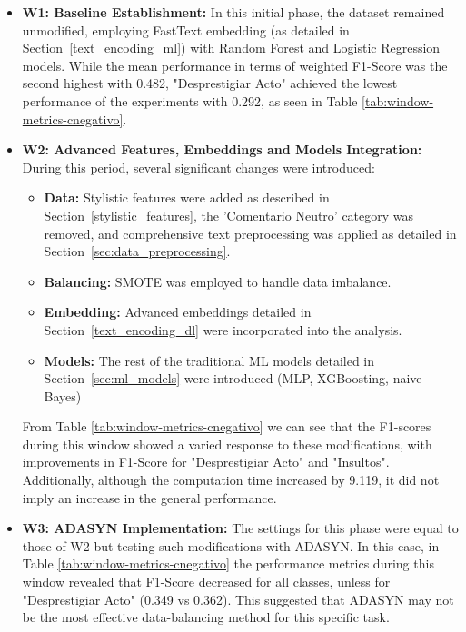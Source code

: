\begin{itemize}
    \item \textbf{W1: Baseline Establishment:} In this initial phase, the dataset remained unmodified, employing FastText embedding (as detailed in Section~\ref{text_encoding_ml}) with Random Forest and Logistic Regression models. While the mean performance in terms of weighted F1-Score was the second highest with 0.482, "Desprestigiar Acto" achieved the lowest performance of the experiments with 0.292, as seen in Table \ref{tab:window-metrics-cnegativo}.


    \item \textbf{W2: Advanced Features, Embeddings and Models Integration:} During this period, several significant changes were introduced:
        \begin{itemize}
            \item \textbf{Data:} Stylistic features were added as described in Section~\ref{stylistic_features}, the 'Comentario Neutro' category was removed, and comprehensive text preprocessing was applied as detailed in Section~\ref{sec:data_preprocessing}.
            \item \textbf{Balancing:} SMOTE was employed to handle data imbalance.
            \item \textbf{Embedding:} Advanced embeddings detailed in Section~\ref{text_encoding_dl} were incorporated into the analysis.
            \item \textbf{Models:} The rest of the traditional ML models detailed in Section~\ref{sec:ml_models} were introduced (MLP, XGBoosting, naive Bayes)
        \end{itemize}
    From Table \ref{tab:window-metrics-cnegativo} we can see that the F1-scores during this window showed a varied response to these modifications, with improvements in F1-Score for "Desprestigiar Acto" and "Insultos". Additionally, although the computation time increased by 9.119, it did not imply an increase in the general performance.


    \item \textbf{W3: ADASYN Implementation:} The settings for this phase were equal to those of W2 but testing such modifications with ADASYN. In this case, in Table \ref{tab:window-metrics-cnegativo} the performance metrics during this window revealed that F1-Score decreased for all classes, unless for "Desprestigiar Acto" (0.349 vs 0.362). This suggested that ADASYN may not be the most effective data-balancing method for this specific task.



\end{itemize}
